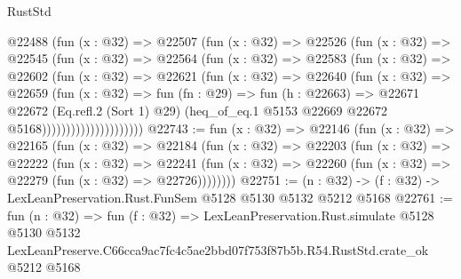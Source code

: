 \begin{lexlean}{RustStd}
\begin{coremodule}
                      @22488
                        (fun (x : @32) =>
                        @22507
                          (fun (x : @32) =>
                          @22526
                            (fun (x : @32) =>
                            @22545
                              (fun (x : @32) =>
                              @22564
                                (fun (x : @32) =>
                                @22583
                                  (fun (x : @32) =>
                                  @22602
                                    (fun (x : @32) =>
                                    @22621
                                      (fun (x : @32) =>
                                      @22640
                                        (fun (x : @32) =>
                                        @22659
                                          (fun (x : @32) =>
                                          fun (fn : @29) =>
                                          fun (h : @22663) =>
                                          @22671
                                            @22672
                                            (Eq.refl.{2} (Sort 1) @29)
                                            (heq_of_eq.{1}
                                              @5153
                                              @22669
                                              @22672
                                              @5168)))))))))))))))))))))
@22743 := fun (x : @32) =>
  @22146
    (fun (x : @32) =>
    @22165
      (fun (x : @32) =>
      @22184
        (fun (x : @32) =>
        @22203
          (fun (x : @32) =>
          @22222
            (fun (x : @32) =>
            @22241
              (fun (x : @32) => @22260 (fun (x : @32) => @22279 (fun (x : @32) => @22726))))))))
@22751 := (n : @32) -> (f : @32) -> LexLeanPreservation.Rust.FunSem @5128 @5130 @5132 @5212 @5168
@22761 := fun (n : @32) =>
  fun (f : @32) =>
  LexLeanPreservation.Rust.simulate
    @5128
    @5130
    @5132
    LexLeanPreserve.C66cca9ac7fc4c5ae2bbd07f753f87b5b.R54.RustStd.crate_ok
    @5212
    @5168
\end{coremodule}
\end{lexlean}
